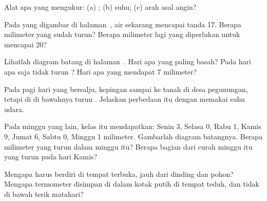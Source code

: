 \begin{exercise}[$\star$]\label{exo:g4:clouds-rain-snow:4}
Alat apa yang mengukur: (a) ; (b) suhu; (c) arah asal angin?
\end{exercise}

\begin{exercise}[$\star$]\label{exo:g4:clouds-rain-snow:5}
Pada  yang digambar di halaman~\pageref{fig:g4:clouds-rain-snow:gauge},
air sekarang mencapai tanda 17. Berapa milimeter  yang sudah turun?
Berapa milimeter lagi yang diperlukan untuk mencapai 20?
\end{exercise}

\begin{exercise}[$\star$]\label{exo:g4:clouds-rain-snow:6}
Lihatlah diagram batang di halaman~\pageref{fig:g4:clouds-rain-snow:bars}.
Hari apa yang paling basah? Pada hari apa saja tidak turun ? Hari apa
yang mendapat 7 milimeter?
\end{exercise}

\begin{exercise}[$\star\star$]\label{exo:g4:clouds-rain-snow:7}
Pada pagi hari yang bersalju, kepingan  sampai ke tanah di desa
pegunungan, tetapi di  di bawahnya turun . Jelaskan perbedaan
itu dengan memakai suhu udara.
\end{exercise}

\begin{exercise}[$\star\star$]\label{exo:g4:clouds-rain-snow:8}
Pada minggu yang lain, kelas itu mendapatkan: Senin 3, Selasa 0, Rabu 1,
Kamis 9, Jumat 6, Sabtu 0, Minggu 1 milimeter. Gambarlah diagram
batangnya. Berapa milimeter yang turun dalam minggu itu? Berapa bagian
dari curah  minggu itu yang turun pada hari Kamis?
\end{exercise}

\begin{exercise}[$\star\star$]\label{exo:g4:clouds-rain-snow:9}
Mengapa  harus berdiri di tempat terbuka, jauh dari dinding
dan pohon? Mengapa termometer disimpan di dalam kotak putih di tempat
teduh, dan tidak di bawah terik matahari?
\end{exercise}


